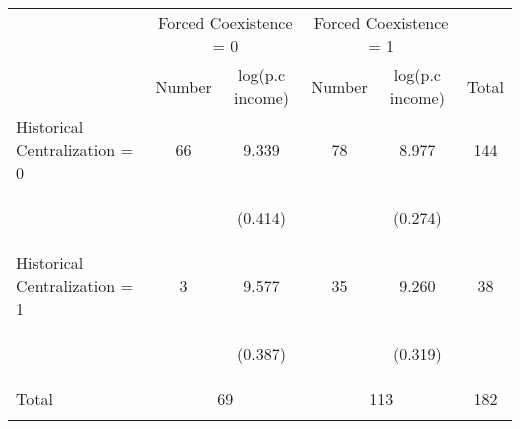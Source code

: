 \begin{center}
\begin{tabular}{lccccc}
\hline \noalign{\smallskip} & \multicolumn{2}{c}{Forced Coexistence = 0} & \multicolumn{2}{c}{Forced Coexistence = 1} & \\
 & Number & log(p.c income) & Number & log(p.c income) & Total\\
\noalign{\smallskip}\hline \noalign{\smallskip}Historical Centralization = 0 & 66 & 9.339 & 78 & 8.977 & 144\\
 & \begin{footnotesize}\end{footnotesize} & \begin{footnotesize}(0.414)\end{footnotesize} & \begin{footnotesize}\end{footnotesize} & \begin{footnotesize}(0.274)\end{footnotesize} & \begin{footnotesize}\end{footnotesize}\\
\noalign{\smallskip}Historical Centralization = 1 & 3 & 9.577 & 35 & 9.260 & 38\\
 & \begin{footnotesize}\end{footnotesize} & \begin{footnotesize}(0.387)\end{footnotesize} & \begin{footnotesize}\end{footnotesize} & \begin{footnotesize}(0.319)\end{footnotesize} & \begin{footnotesize}\end{footnotesize}\\
\noalign{\smallskip}Total & \multicolumn{2}{c}{69} & \multicolumn{2}{c}{113} & 182\\
\noalign{\smallskip}\hline\end{tabular}\\
\end{center}
